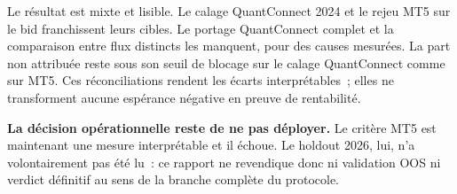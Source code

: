 

Le résultat est mixte et lisible. Le calage QuantConnect 2024 et le rejeu MT5
sur le bid franchissent leurs cibles. Le portage QuantConnect complet et la
comparaison entre flux distincts les manquent, pour des causes mesurées. La
part non attribuée reste sous son seuil de blocage sur le calage QuantConnect
comme sur MT5. Ces réconciliations rendent les écarts interprétables~; elles ne
transforment aucune espérance négative en preuve de rentabilité.

\begin{warningbox}
\textbf{La décision opérationnelle reste de ne pas déployer.} Le critère MT5
est maintenant une mesure interprétable et il échoue. Le holdout 2026, lui,
n'a volontairement pas été lu~: ce rapport ne revendique donc ni validation
OOS ni verdict définitif au sens de la branche complète du protocole.
\end{warningbox}
